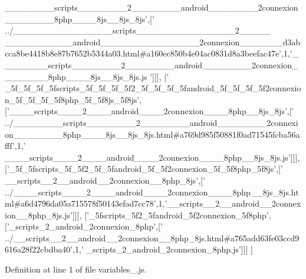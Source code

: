 \begin{DoxyCode}
{      \_\_\_\_\_\_\_\_scripts\_\_\_\_\_\_\_\_2\_\_\_\_\_\_\_\_android\_\_\_\_\_\_\_\_2connexion\_\_\_\_\_\_\_\_8php\_\_\_\_8js\_\_8js\_8js'},[\textcolor{stringliteral}{'
      ../\_\_\_\_\_\_\_\_\_\_\_\_\_\_\_\_scripts\_\_\_\_\_\_\_\_\_\_\_\_\_\_\_\_2\_\_\_\_\_
      \_\_\_\_\_\_\_\_\_\_\_android\_\_\_\_\_\_\_\_\_\_\_\_\_\_\_\_2connexion\_\_\_\_\_\_\_d3abcca8be4418b8e87b7652b5344a03.html#a160ec850b4e04ac0831d8a3beefac47e'},1,\textcolor{stringliteral}{'\_\_\_\_\_\_\_\_scripts\_\_\_\_\_\_\_\_2\_\_\_\_\_\_\_\_android\_\_\_\_\_\_\_\_2connexion\_\_\_\_\_\_\_\_8php\_\_\_\_8js\_\_8js\_8js.js
      '}]]],
  [\textcolor{stringliteral}{'
      \_5f\_5f\_5f\_5fscripts\_5f\_5f\_5f\_5f2\_5f\_5f\_5f\_5fandroid\_5f\_5f\_5f\_5f2connexion\_5f\_5f\_5f\_5f8php\_5f\_5f8js\_5f8js'},[\textcolor{stringliteral}{'\_\_\_\_scripts\_\_\_\_2\_\_\_\_android\_\_\_\_2connexion\_\_\_\_8php\_\_8js\_8js'},[\textcolor{stringliteral}{'
      ../\_\_\_\_\_\_\_\_scripts\_\_\_\_\_\_\_\_2\_\_\_\_\_\_\_\_android\_\_\_\_\_\_\_\_2connexion\_\_\_\_\_\_\_\_8php\_\_\_\_8js\_\_8js\_8js.html#a769d985f50881f0ad71545fcba56afff'},1,\textcolor{stringliteral}{'
      \_\_\_\_scripts\_\_\_\_2\_\_\_\_android\_\_\_\_2connexion\_\_\_\_8php\_\_8js\_8js.js'}]]],
  [\textcolor{stringliteral}{'\_5f\_5fscripts\_5f\_5f2\_5f\_5fandroid\_5f\_5f2connexion\_5f\_5f8php\_5f8js'},[\textcolor{stringliteral}{'
      \_\_scripts\_\_2\_\_android\_\_2connexion\_\_8php\_8js'},[\textcolor{stringliteral}{'
      ../\_\_\_\_scripts\_\_\_\_2\_\_\_\_android\_\_\_\_2connexion\_\_\_\_8php\_\_8js\_8js.html#a6d4796da05a715578f50143efad7cc78'},1,\textcolor{stringliteral}{'\_\_scripts\_\_2\_\_android\_\_2connexion\_\_8php\_8js.js'}]]],
  [\textcolor{stringliteral}{'\_5fscripts\_5f2\_5fandroid\_5f2connexion\_5f8php'},[\textcolor{stringliteral}{'\_scripts\_2\_android\_2connexion\_8php'},[\textcolor{stringliteral}{'
      ../\_\_scripts\_\_2\_\_android\_\_2connexion\_\_8php\_8js.html#a765add63fe03ccd9616a28f22cbdba40'},1,\textcolor{stringliteral}{'
      \_scripts\_2\_android\_2connexion\_8php.js'}]]]
]
\end{DoxyCode}


Definition at line 1 of file variables\+\_.\+js.

